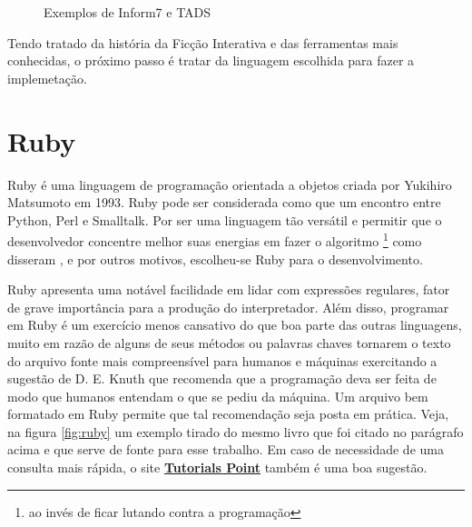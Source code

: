 \begin{figure}
  \centering
  \caption{Exemplos de Inform7 e TADS}
  \label{fig:other-tools}
\end{figure}

Tendo tratado da história da Ficção Interativa e das ferramentas mais conhecidas,
o próximo passo é tratar da linguagem escolhida para fazer a implemetação.

\section{Ruby}
\label{cap:ruby}

Ruby é uma linguagem de programação orientada a objetos criada por Yukihiro
Matsumoto em 1993. Ruby pode ser considerada como que um encontro entre Python,
Perl e Smalltalk. Por ser uma linguagem tão versátil e permitir que o
desenvolvedor concentre melhor suas energias em fazer o algoritmo \footnote{ao
invés de ficar lutando contra a programação}  como disseram \citet{Rcook:09}, e
por outros motivos, escolheu-se Ruby para o desenvolvimento.

Ruby apresenta uma notável facilidade em lidar com expressões regulares, fator
de grave importância para a produção do interpretador. Além disso, programar em
Ruby é um exercício menos cansativo do que boa parte das outras linguagens,
muito em razão de alguns de seus métodos ou palavras chaves tornarem o texto do
arquivo fonte mais compreensível para humanos e máquinas exercitando a sugestão
de D. E. Knuth que recomenda que a programação deva ser feita de modo que
humanos entendam o que se pediu da máquina. Um arquivo bem formatado em Ruby
permite que tal recomendação seja posta em prática. Veja, na figura
\ref{fig:ruby} um exemplo tirado do mesmo livro que foi citado no parágrafo
acima e que serve de fonte para esse trabalho. Em caso de necessidade de uma
consulta mais rápida, o site
\href{https://www.tutorialspoint.com/ruby/index.htm}{\textbf{Tutorials Point}}
também é uma boa sugestão.

